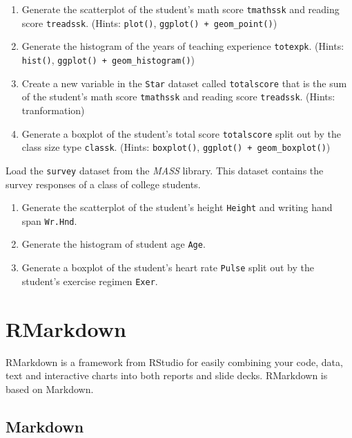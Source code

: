 \documentclass[
]{book}
\providecommand{\tightlist}{%
  \setlength{\itemsep}{0pt}\setlength{\parskip}{0pt}}
\begin{document}
\begin{enumerate}
\def\labelenumi{\arabic{enumi}.}
\tightlist
\item
  Generate the scatterplot of the student's math score \texttt{tmathssk} and reading score \texttt{treadssk}. (Hints: \texttt{plot()}, \texttt{ggplot()\ +\ geom\_point()})
\item
  Generate the histogram of the years of teaching experience \texttt{totexpk}. (Hints: \texttt{hist()}, \texttt{ggplot()\ +\ geom\_histogram()})
\item
  Create a new variable in the \texttt{Star} dataset called \texttt{totalscore} that is the sum of the student's math score \texttt{tmathssk} and reading score \texttt{treadssk}. (Hints: tranformation)
\item
  Generate a boxplot of the student's total score \texttt{totalscore} split out by the class size type \texttt{classk}. (Hints: \texttt{boxplot()}, \texttt{ggplot()\ +\ geom\_boxplot()})
\end{enumerate}

Load the \texttt{survey} dataset from the \emph{MASS} library. This dataset contains the survey responses of a class of college students.

\begin{enumerate}
\def\labelenumi{\arabic{enumi}.}
\setcounter{enumi}{4}
\tightlist
\item
  Generate the scatterplot of the student's height \texttt{Height} and writing hand span \texttt{Wr.Hnd}.
\item
  Generate the histogram of student age \texttt{Age}.
\item
  Generate a boxplot of the student's heart rate \texttt{Pulse} split out by the student's exercise regimen \texttt{Exer}.
\end{enumerate}

\hypertarget{rmarkdown}{%
\chapter{RMarkdown}\label{rmarkdown}}

RMarkdown is a framework from RStudio for easily combining your code, data, text and interactive charts into both reports and slide decks. RMarkdown is based on Markdown.

\hypertarget{markdown}{%
\section{Markdown}\label{markdown}}
\end{document}
